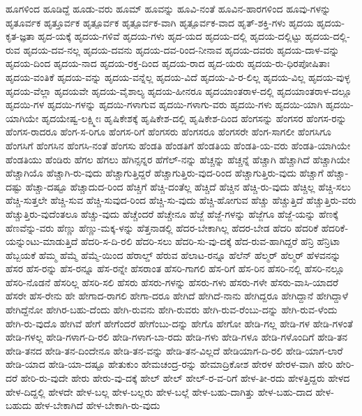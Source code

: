 {ಹೂಗಳಿಂದ
ಹೂಡಿದ್ದೆ
ಹೂಡು-ವರು
ಹೂಮ್
ಹೂವನ್ನು
ಹೂವಿ-ನಂತೆ
ಹೂವಿನ-ಹಾರಗಳಿಂದ
ಹೂವು-ಗಳನ್ನು
ಹೃತೂರ್ವಕ
ಹೃತ್ತೂರ್ವಕ
ಹೃತ್ಪೂರ್ವಕ
ಹೃತ್ಪೂರ್ವಕ-ವಾಗಿ
ಹೃತ್ಪೂರ್ವಕ-ವಾದ
ಹೃತ್-ಶಕ್ತಿ-ಗಳು
ಹೃದಯ
ಹೃದಯ-ಕೃತ-ಜ್ಞತಾ
ಹೃದ-ಯಕ್ಕೆ
ಹೃದಯ-ಗಳಿವೆ
ಹೃದಯ-ಗಳು
ಹೃದ-ಯದ
ಹೃದಯ-ದಲ್ಲಿ
ಹೃದಯ-ದಲ್ಲಿಟ್ಟು
ಹೃದಯ-ದಲ್ಲಿ-ರುವ
ಹೃದಯ-ದವ-ನಲ್ಲ
ಹೃದಯ-ದವನು
ಹೃದಯ-ದವ-ರಿಂದ-ನೀನಾವ
ಹೃದಯ-ದವರು
ಹೃದಯ-ದಾಳ-ವನ್ನು
ಹೃದಯ-ದಿಂದ
ಹೃದಯ-ನಾದ
ಹೃದಯ-ರಕ್ತ-ದಿಂದ
ಹೃದಯ-ರಾದ
ಹೃದ-ಯರು
ಹೃದಯ-ರು-ಧಿರಪೋಷಿತಾಃ
ಹೃದಯ-ವಂತಿಕೆ
ಹೃದಯ-ವನ್ನು
ಹೃದಯ-ವನ್ನೆಲ್ಲ
ಹೃದಯ-ವಿದೆ
ಹೃದಯ-ವಿ-ರ-ಲಿಲ್ಲ
ಹೃದಯ-ವಿಲ್ಲ
ಹೃದಯ-ವುಳ್ಳ
ಹೃದಯ-ವೆಲ್ಲಾ
ಹೃದಯವೇ
ಹೃದಯ-ವೈಶಾಲ್ಯ
ಹೃದಯ-ಹೀನರೂ
ಹೃದಯಾಂತರಾಳ-ದಲ್ಲಿ
ಹೃದಯಾಂತರಾಳ-ದಲ್ಲೂ
ಹೃದಯಿ-ಗಳ
ಹೃದಯಿ-ಗಳನ್ನು
ಹೃದಯಿ-ಗಳಾಗುವ
ಹೃದಯಿ-ಗಳಾಗು-ವರು
ಹೃದಯಿ-ಗಳು
ಹೃದಯಿ-ಯಾಗಿ
ಹೃದಯಿ-ಯಾಗಿಯೇ
ಹೃದಯೇಷ್ವ-ಲಕ್ಷ್ಮೀಃ
ಹೃಷಿಕೇಶಕ್ಕೆ
ಹೃಷಿಕೇಶ-ದಲ್ಲಿ
ಹೃಷಿಕೇಶ-ದಿಂದ
ಹೆಂಗಸನ್ನು
ಹೆಂಗಸರ
ಹೆಂಗಸ-ರನ್ನು
ಹೆಂಗಸ-ರಾದರೂ
ಹೆಂಗ-ಸ-ರಿಗೂ
ಹೆಂಗಸ-ರಿಗೆ
ಹೆಂಗಸರು
ಹೆಂಗಸರೂ
ಹೆಂಗಸರೇ
ಹೆಂಗ-ಸಾಗಲೀ
ಹೆಂಗಸಿಗೂ
ಹೆಂಗಸಿಗೆ
ಹೆಂಗಸಿನ
ಹೆಂಗಸಿ-ನಂತೆ
ಹೆಂಗಸು
ಹೆಂಡತಿ
ಹೆಂಡತಿಗೆ
ಹೆಂಡತಿಯ
ಹೆಂಡತಿ-ಯ-ವರು
ಹೆಂಡತಿ-ಯಾಗಿಯೇ
ಹೆಂಡತಿಯು
ಹೆಂಡಿರು
ಹೆಗಲ
ಹೆಗಲು
ಹೆಗಿನ್ಸನ್ನರ
ಹೆಗೆಲ್-ನನ್ನು
ಹೆಚ್ಚನ್ನು
ಹೆಚ್ಚನ್ನೆ
ಹೆಚ್ಚಾಗಿ
ಹೆಚ್ಚಾಗಿದೆ
ಹೆಚ್ಚಾಗಿಯೇ
ಹೆಚ್ಚಾಗಿಯೊ
ಹೆಚ್ಚಾಗಿ-ರು-ವುದು
ಹೆಚ್ಚಾಗುತ್ತಿದ್ದರೆ
ಹೆಚ್ಚಾಗುತ್ತಿರು-ವುದ-ರಿಂದ
ಹೆಚ್ಚಾಗುತ್ತಿರು-ವುದು
ಹೆಚ್ಚಾಗೆ
ಹೆಚ್ಚಾ-ದಷ್ಟು
ಹೆಚ್ಚಾ-ದಷ್ಟೂ
ಹೆಚ್ಚಾದುದ-ರಿಂದ
ಹೆಚ್ಚಿಗೆ
ಹೆಚ್ಚಿ-ದಂತೆಲ್ಲ
ಹೆಚ್ಚಿದೆ
ಹೆಚ್ಚಿನ
ಹೆಚ್ಚಿ-ರು-ವುದು
ಹೆಚ್ಚಿಲ್ಲ
ಹೆಚ್ಚಿ-ಸಲು
ಹೆಚ್ಚಿ-ಸುತ್ತಲೇ
ಹೆಚ್ಚಿ-ಸುವ
ಹೆಚ್ಚಿ-ಸುವುದ-ರಿಂದ
ಹೆಚ್ಚಿ-ಸು-ವುದು
ಹೆಚ್ಚಿ-ಹೋಗುವ
ಹೆಚ್ಚು
ಹೆಚ್ಚುತ್ತಿದೆ
ಹೆಚ್ಚುತ್ತಿರು-ವರು
ಹೆಚ್ಚುತ್ತಿರು-ವುದೆಂತಲೂ
ಹೆಚ್ಚು-ವುದು
ಹೆಚ್ಚೆಂದರೆ
ಹೆಚ್ಚೇನೂ
ಹೆಜ್ಜೆ
ಹೆಜ್ಜೆ-ಗಳನ್ನು
ಹೆಜ್ಜೆಗೂ
ಹೆಜ್ಜೆ-ಯನ್ನು
ಹೆಣಕ್ಕೆ
ಹೆಣವೆನ್ನು-ವರು
ಹೆಣ್ಣು
ಹೆಣ್ಣು-ಮಕ್ಕ-ಳನ್ನು
ಹೆತ್ತನಾಡಲ್ಲಿ
ಹೆದರ-ಬೇಕಾಗಿಲ್ಲ
ಹೆದರ-ಬೇಡ
ಹೆದರಿ
ಹೆದರಿಕೆ
ಹೆದರಿಕೆ-ಯನ್ನುಂಟು-ಮಾಡುತ್ತಿದೆ
ಹೆದರಿ-ಸ-ದಿ-ರಲಿ
ಹೆದರಿ-ಸಲು
ಹೆದರಿ-ಸು-ವು-ದಕ್ಕೆ
ಹೆದ-ರುವ-ಹಾಗಿದ್ದರೆ
ಹೆನ್ರಿ
ಹೆನ್ರಿಟಾ
ಹೆಬ್ಬಯಕೆ
ಹೆಮ್ಮ
ಹೆಮ್ಮೆ
ಹೆಮ್ಮೆ-ಯಿಂದ
ಹೆರಾಲ್ಡ್
ಹೆರುವ
ಹೆಲಾಟ-ರನ್ನೂ
ಹೆಲೆನ್
ಹೆಲ್ಮರ್
ಹೆಲ್ಮರ್
ಹೆಳವನನ್ನು
ಹೆಸರ
ಹೆಸ-ರನ್ನು
ಹೆಸ-ರನ್ನೂ
ಹೆಸ-ರನ್ನೇ
ಹೆಸರಾಂತ
ಹೆಸರಿ-ಗಾಗಲಿ
ಹೆಸ-ರಿಗೆ
ಹೆಸ-ರಿನ
ಹೆಸರಿ-ನಲ್ಲಿ
ಹೆಸರಿ-ನಲ್ಲೂ
ಹೆಸರಿ-ನೊಡನೆ
ಹೆಸರಿಲ್ಲ
ಹೆಸರಿ-ಸಲಿ
ಹೆಸರು
ಹೆಸರು-ಗಳನ್ನು
ಹೆಸರು-ಗಳು
ಹೆಸರು-ಗಳೇ
ಹೆಸರು-ವಾಸಿ-ಯಾದರೆ
ಹೆಸರೇ
ಹೆಸ-ರೇನು
ಹೇ
ಹೇಗಾದ-ರಾಗಲಿ
ಹೇಗಾ-ದರೂ
ಹೇಗಿದೆ
ಹೇಗಿದೆ-ನಾನು
ಹೇಗಿದ್ದರೂ
ಹೇಗಿದ್ದಾನೆ
ಹೇಗಿದ್ದಾಳೆ
ಹೇಗಿದ್ದೆನೋ
ಹೇಗಿರ-ಬಹು-ದೆಂದು
ಹೇಗಿ-ರುವನು
ಹೇಗಿ-ರುವರು
ಹೇಗಿ-ರುವ-ರೆಂಬು-ದನ್ನು
ಹೇಗಿ-ರುವ-ಳೆಂದು
ಹೇಗಿ-ರು-ವುದೊ
ಹೇಗಿವೆ
ಹೇಗೆ
ಹೇಗೆಂದರೆ
ಹೇಗೆಂಬು-ದನ್ನು
ಹೇಗೊ
ಹೇಗೋ
ಹೇಡಿ-ಗಲ್ಲ
ಹೇಡಿ-ಗಳ
ಹೇಡಿ-ಗಳಂತೆ
ಹೇಡಿ-ಗಳಲ್ಲ
ಹೇಡಿ-ಗಳಾಗ-ದಿ-ರಲಿ
ಹೇಡಿ-ಗಳಾಗ-ಬಾ-ರದು
ಹೇಡಿ-ಗಳು
ಹೇಡಿ-ಗಳೂ
ಹೇಡಿ-ಗಳೊಂದಿಗೆ
ಹೇಡಿ-ತನ
ಹೇಡಿ-ತನದ
ಹೇಡಿ-ತನ-ದಿಂದೇನೂ
ಹೇಡಿ-ತನ-ವನ್ನು
ಹೇಡಿ-ತನ-ವಿಲ್ಲದೆ
ಹೇಡಿಯಾಗ-ದಿ-ರಲಿ
ಹೇಡಿ-ಯಾಗ-ಲಾರೆ
ಹೇಡಿ-ಯಾದ
ಹೇಡಿ-ಯಾ-ದಷ್ಟೂ
ಹೇತುಕುಂ
ಹೇಮಚಂದ್ರ-ರನ್ನು
ಹೇಮಾದ್ರಿಕೋಶ
ಹೇರಳ
ಹೇರಳ-ವಾಗಿ
ಹೇರಿ
ಹೇರಿ-ದರೆ
ಹೇರಿ-ರು-ವುದೇ
ಹೇರು
ಹೇರು-ವು-ದಕ್ಕೆ
ಹೇಲ್
ಹೇಲ್
ಹೇಲ್-ರ-ವ-ರಿಗೆ
ಹೇಳ-ತೀ-ರದು
ಹೇಳತ್ತಿದ್ದರು
ಹೇಳದ
ಹೇಳ-ದಿದ್ದಲ್ಲಿ
ಹೇಳದೇ
ಹೇಳ-ಬಲ್ಲ
ಹೇಳ-ಬಲ್ಲರು
ಹೇಳ-ಬಲ್ಲೆ
ಹೇಳ-ಬಹು-ದಾಗಿತ್ತು
ಹೇಳ-ಬಹು-ದಾದ
ಹೇಳ-ಬಹುದು
ಹೇಳ-ಬೇಕಾಗಿದೆ
ಹೇಳ-ಬೇಕಾಗಿ-ರು-ವುದು
}
